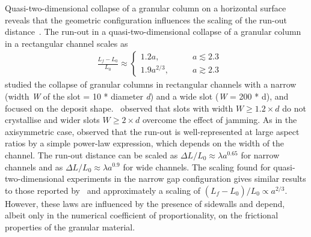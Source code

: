 
Quasi-two-dimensional collapse of a granular column on a horizontal 
surface reveals that the geometric configuration influences the scaling of the 
run-out distance~\citep{Lajeunesse2005}. The run-out in a 
quasi-two-dimensional collapse of a granular column in a rectangular channel 
scales as 
\begin{align}
& \frac{\textit{L}_{\textit{f}}- 
\textit{L}_{\textit{0}}}{\textit{L}_{\textit{0}}} \approx
\begin{cases} 
1.2\textit{a}, \qquad &\textit{a} \lesssim 2.3 \\
1.9\textit{a}^{2/3}, \qquad &\textit{a} \gtrsim 2.3
\end{cases}
\end{align} 
%
\citet{Balmforth2005} studied the collapse of granular columns in rectangular 
channels with a narrow (width \textit{W} of the slot = 10 * diameter 
\textit{d}) and a wide slot (\textit{W} = 200 * d), and focused on the deposit 
shape.~\citet{Lacaze2008} observed that slots with width $W \ge1.2 \times d$ 
do not crystallise and wider slots $W \ge 2 \times d$ overcome the effect 
of jamming. As in the axisymmetric case, \citet{Balmforth2005} observed that 
the run-out is well-represented at large aspect ratios by a 
simple power-law expression, which depends on the width of the channel. The 
run-out distance can be scaled as $\Delta \textit{L}/\textit{L}_{\textit{0}} 
\approx \lambda \textit{a}^{0.65}$ for narrow channels and as $\Delta 
\textit{L}/\textit{L}_{\textit{0}} \approx \lambda \textit{a}^{0.9}$ for wide 
channels. The scaling found for quasi-two-dimensional experiments in the narrow 
gap configuration gives similar results to those reported by~\citet{Lube2005} 
and approximately a scaling of $({\textit{L}_{\textit{f}} - 
\textit{L}_{\textit{0}}})/\textit{L}_{\textit{0}} \propto \textit{a}^{2/3}$. 
However, these laws are influenced by the presence of sidewalls and depend, 
albeit only in the numerical coefficient of proportionality, on the frictional 
properties of the granular material. 

